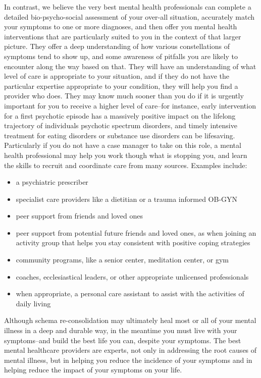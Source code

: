\documentclass[12pt,letterpaper]{book}
\begin{document}
In contrast, we believe the very best mental health professionals can complete a detailed bio-psycho-social assessment of your over-all situation, accurately match your symptoms to one or more diagnoses, and then offer you mental health interventions that are particularly suited to you in the context of that larger picture. They offer a deep understanding of how various constellations of symptoms tend to show up, and some awareness of pitfalls you are likely to encounter along the way based on that. They will have an understanding of what level of care is appropriate to your situation, and if they do not have the particular expertise appropriate to your condition, they will help you find a provider who does. They may know much sooner than you do if it is urgently important for you to receive a higher level of care–for instance, early intervention for a first psychotic episode has a massively positive impact on the lifelong trajectory of individuals psychotic spectrum disorders, and timely intensive treatment for eating disorders or substance use disorders can be lifesaving. Particularly if you do not have a case manager to take on this role, a mental health professional may help you work though what is stopping you, and learn the skills to recruit and coordinate care from many sources. Examples include:
\begin{itemize}
    \item a psychiatric prescriber 
    \item specialist care providers like a dietitian or a trauma informed OB-GYN
    \item peer support from friends and loved ones
    \item peer support from potential future friends and loved ones, as when joining an activity group that helps you stay consistent with positive coping strategies
    \item community programs, like a senior center, meditation center, or gym
    \item coaches, ecclesiastical leaders, or other appropriate unlicensed professionals
    \item when appropriate, a personal care assistant to assist with the activities of daily living
\end{itemize}
Although schema re-consolidation may ultimately heal most or all of your mental illness in a deep and durable way, in the meantime you must live with your symptoms–and build the best life you can, despite your symptoms. The best mental healthcare providers are experts, not only in addressing the root causes of mental illness, but in helping you reduce the incidence of your symptoms and in helping reduce the impact of your symptoms on your life. 
\end{document}
